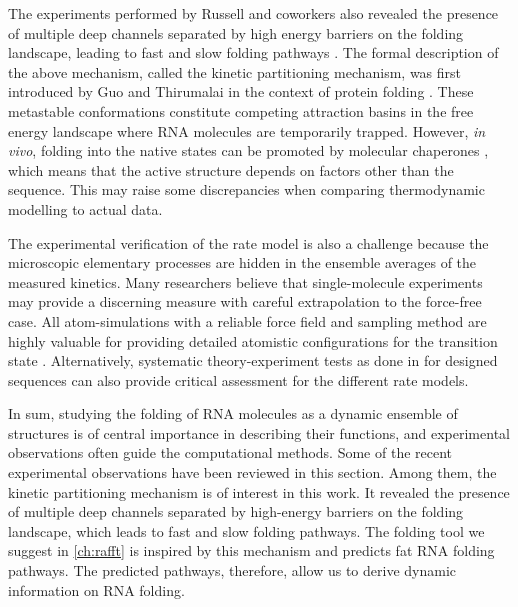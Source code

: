 The experiments performed by Russell and coworkers also revealed the presence of multiple deep channels separated by high energy barriers on the folding landscape, leading to fast and slow folding pathways \cite{russell2002exploring}. The formal description of the above mechanism, called the kinetic partitioning mechanism, was first introduced by Guo and Thirumalai in the context of protein folding \cite{guo95_kinet_protein_foldin}. These metastable conformations constitute competing attraction basins in the free energy landscape where \ac{RNA} molecules are temporarily trapped. However, \textit{in vivo}, folding into the native states can be promoted by molecular chaperones \cite{chakrabarti2017molecular}, which means that the active structure depends on factors other than the sequence. This may raise some discrepancies when comparing thermodynamic modelling to actual data. 

The experimental verification of the rate model is also a challenge because the microscopic elementary processes are hidden in the ensemble averages of the measured kinetics. Many researchers believe that single-molecule experiments may provide a discerning measure with careful extrapolation to the force-free case. All atom-simulations with a reliable force field and sampling method are highly valuable for providing detailed atomistic configurations for the transition state \cite{chen2008rna}. Alternatively, systematic theory-experiment tests as done in \cite{zhang06_explor_compl_foldin_kinet_rna_hairp} for designed sequences can also provide critical assessment for the different rate models.


In sum, studying the folding of RNA molecules as a dynamic ensemble of structures is of central importance in describing their functions, and experimental observations often guide the computational methods. Some of the recent experimental observations have been reviewed in this section. Among them, the kinetic partitioning mechanism is of interest in this work. It revealed the presence of multiple deep channels separated by high-energy barriers on the folding landscape, which leads to fast and slow folding pathways. The folding tool we suggest in \autoref{ch:rafft} is inspired by this mechanism and predicts fat \ac{RNA} folding pathways. The predicted pathways, therefore, allow us to derive dynamic information on RNA folding.

